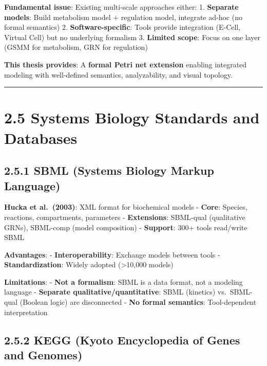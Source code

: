 \textbf{Fundamental issue}: Existing multi-scale approaches either: 1.
\textbf{Separate models}: Build metabolism model + regulation model,
integrate ad-hoc (no formal semantics) 2. \textbf{Software-specific}:
Tools provide integration (E-Cell, Virtual Cell) but no underlying
formalism 3. \textbf{Limited scope}: Focus on one layer (GSMM for
metabolism, GRN for regulation)

\textbf{This thesis provides}: A \textbf{formal Petri net extension}
enabling integrated modeling with well-defined semantics, analyzability,
and visual topology.

\begin{center}\rule{0.5\linewidth}{0.5pt}\end{center}

\hypertarget{systems-biology-standards-and-databases}{%
\section{2.5 Systems Biology Standards and
Databases}\label{systems-biology-standards-and-databases}}

\hypertarget{sbml-systems-biology-markup-language}{%
\subsection{2.5.1 SBML (Systems Biology Markup
Language)}\label{sbml-systems-biology-markup-language}}

\textbf{Hucka et al.~(2003)}: XML format for biochemical models -
\textbf{Core}: Species, reactions, compartments, parameters -
\textbf{Extensions}: SBML-qual (qualitative GRNs), SBML-comp (model
composition) - \textbf{Support}: 300+ tools read/write SBML

\textbf{Advantages}: - \textbf{Interoperability}: Exchange models
between tools - \textbf{Standardization}: Widely adopted
(\textgreater10,000 models)

\textbf{Limitations}: - \textbf{Not a formalism}: SBML is a data format,
not a modeling language - \textbf{Separate qualitative/quantitative}:
SBML (kinetics) vs.~SBML-qual (Boolean logic) are disconnected -
\textbf{No formal semantics}: Tool-dependent interpretation

\hypertarget{kegg-kyoto-encyclopedia-of-genes-and-genomes}{%
\subsection{2.5.2 KEGG (Kyoto Encyclopedia of Genes and
Genomes)}\label{kegg-kyoto-encyclopedia-of-genes-and-genomes}}

